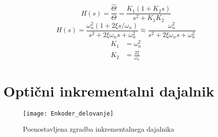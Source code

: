 \documentclass[a4paper,twoside,openright,12pt]{book}
\begin{document}
\begin{equation} \label{resolver_trfcn1}
H(s) = \frac{\hat{\Theta}}{\Theta} = \frac{K_{1}(1+K_{2}s)}{s^{2}+K_{1}K_{2}} 
\end{equation}
\begin{equation} \label{resolver_trfcn2}
H(s) = \frac{\omega_{n}^{2}(1+2\xi s/\omega_{n})}{s^{2}+2\xi\omega_{n}s+\omega_{n}^{2}} \approx\frac{\omega_{n}^{2}}{s^{2}+2\xi\omega_{n}s+\omega_{n}^{2}}
\end{equation}
\begin{equation} \label{resolver_trfcn3}
\begin{aligned}
K_{1} & =\omega_{n}^{2}\\[5pt]
K_{2} & =\frac{2\xi}{\omega_{n}}
\end{aligned}
\end{equation}
\section[Optični inkrementalni dajalnik]{Optični inkrementalni dajalnik}
\begin{figure}[h]
	\centering
	\texttt{[image: Enkoder\_delovanje]}
	\caption{\label{inkr_enkoder_del} Poenostavljena zgradba inkrementalnega dajalnika}
\end{figure}
\end{document}
